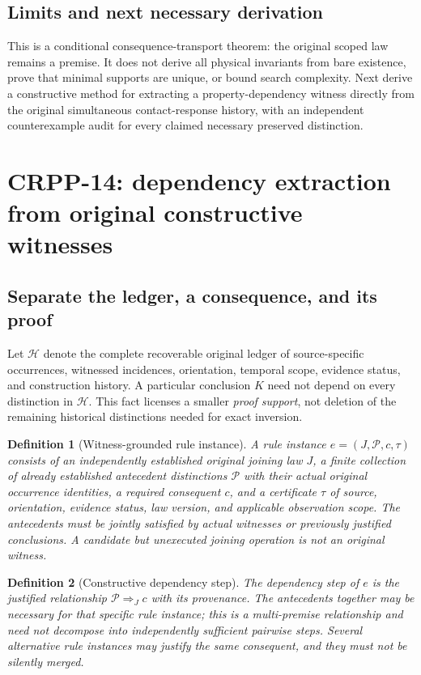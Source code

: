 \documentclass[11pt]{article}
\newtheorem{definition}{Definition}[section]
\newcommand{\Hist}{\mathcal{H}}
\begin{document}
\subsection{Limits and next necessary derivation}
This is a conditional consequence-transport theorem:
the original scoped law remains a premise. It
does not derive all physical invariants from
bare existence, prove that minimal supports
are unique, or bound search complexity.
Next derive a constructive method for extracting
a property-dependency witness directly from
the original simultaneous contact-response history,
with an independent counterexample audit
for every claimed necessary preserved distinction.


\section{CRPP-14: dependency extraction from original constructive witnesses}
\label{sec:crpp14}

\subsection{Separate the ledger, a consequence, and its proof}
Let $\Hist$ denote the complete recoverable original ledger
of source-specific occurrences, witnessed incidences,
orientation, temporal scope, evidence status, and construction
history. A particular conclusion $K$ need not depend on
every distinction in $\Hist$. This fact licenses a smaller
\emph{proof support}, not deletion of the remaining historical
distinctions needed for exact inversion.

\begin{definition}[Witness-grounded rule instance]
A rule instance $e=(J,\mathcal P,c,\tau)$ consists of an
independently established original joining law $J$, a
finite collection of already established antecedent
distinctions $\mathcal P$ with their actual original
occurrence identities, a required consequent $c$, and
a certificate $\tau$ of source, orientation, evidence
status, law version, and applicable observation scope.
The antecedents must be jointly satisfied by actual
witnesses or previously justified conclusions. A
candidate but unexecuted joining operation is not an
original witness.
\end{definition}

\begin{definition}[Constructive dependency step]
The dependency step of $e$ is the justified relationship
$\mathcal P\Rightarrow_J c$ with its provenance.
The antecedents together may be necessary for that
specific rule instance; this is a \emph{multi-premise}
relationship and need not decompose into independently
sufficient pairwise steps. Several alternative rule
instances may justify the same consequent, and they
must not be silently merged.
\end{definition}
\end{document}
